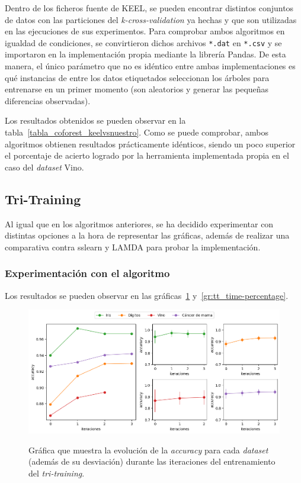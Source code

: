 Dentro de los ficheros fuente de KEEL, se pueden encontrar distintos conjuntos de datos con las particiones del \textit{k-cross-validation} ya hechas y que son utilizadas en las ejecuciones de sus experimentos. Para comprobar ambos algoritmos en igualdad de condiciones, se convirtieron dichos archivos \texttt{*.dat} en \texttt{*.csv} y se importaron en la implementación propia mediante la librería Pandas. De esta manera, el único parámetro que no es idéntico entre ambas implementaciones es qué instancias de entre los datos etiquetados seleccionan los árboles para entrenarse en un primer momento (son aleatorios y generar las pequeñas diferencias observadas).

Los resultados obtenidos se pueden observar en la tabla~\ref{tabla_coforest_keelvsnuestro}. Como se puede comprobar, ambos algoritmos obtienen resultados prácticamente idénticos, siendo un poco superior el porcentaje de acierto logrado por la herramienta implementada propia en el caso del \textit{dataset} Vino.


\subsection{Tri-Training}

Al igual que en los algoritmos anteriores, se ha decidido experimentar con distintas opciones a la hora de representar las gráficas, además de realizar una comparativa contra sslearn y LAMDA para probar la implementación.


\subsubsection{Experimentación con el algoritmo}

Los resultados se pueden observar en las gráficas~\ref{gr:tt_train-iterations} y~\ref{gr:tt_time-percentage}.

\begin{figure}[h]
	\caption[\textit{Tri-training}: resultados experimentación (iteraciones-entrenamiento)]{Gráfica que muestra la evolución de la \textit{accuracy} para cada \textit{dataset} (además de su desviación) durante las iteraciones del entrenamiento del \textit{tri-training}.}
	\centering
	\includegraphics[scale=0.5]{../img/memoria/5_tritraining_score-iteraciones}
	\label{gr:tt_train-iterations}
\end{figure}

